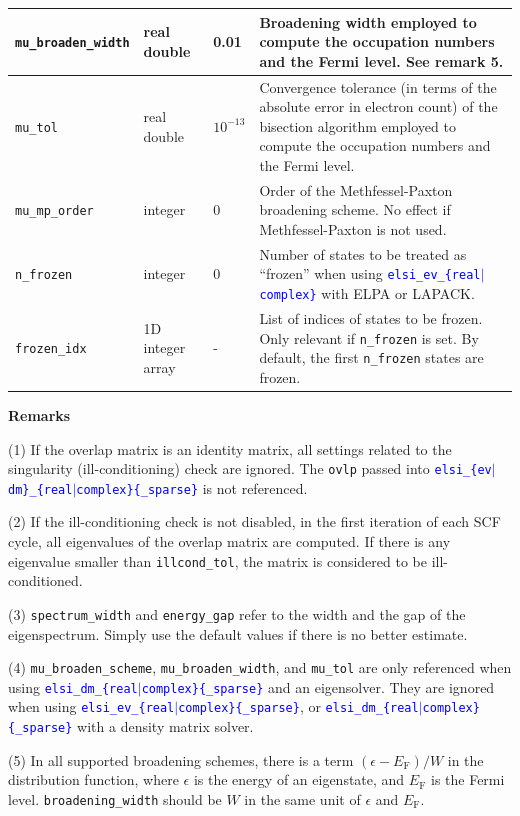 \documentclass{report}
\newcommand{\api}[1]{\textcolor{blue}{\texttt{#1}}}
\begin{document}
\begin{longtable}[]{|p{30mm}|p{20mm}|p{15mm}|p{97mm}|}
\hline
\texttt{mu\_broaden\_width}  & real double      & 0.01        & Broadening width employed to compute the occupation numbers and the Fermi level. See remark 5.\\
\hline
\texttt{mu\_tol}             & real double      & $10^{-13}$  & Convergence tolerance (in terms of the absolute error in electron count) of the bisection algorithm employed to compute the occupation numbers and the Fermi level.\\
\hline
\texttt{mu\_mp\_order}       & integer          & 0           & Order of the Methfessel-Paxton broadening scheme. No effect if Methfessel-Paxton is not used.\\
\hline
\texttt{n\_frozen}           & integer          & 0           & Number of states to be treated as ``frozen'' when using \api{elsi\_ev\_\{real$\vert$complex\}} with ELPA or LAPACK.\\
\hline
\texttt{frozen\_idx}         & 1D integer array & -           & List of indices of states to be frozen. Only relevant if \texttt{n\_frozen} is set. By default, the first \texttt{n\_frozen} states are frozen.\\
\hline
\end{longtable}

\textbf{Remarks}

(1) If the overlap matrix is an identity matrix, all settings related to the singularity (ill-conditioning) check are ignored. The \texttt{ovlp} passed into \api{elsi\_\{ev$\vert$dm\}\_\{real$\vert$complex\}\{\_sparse\}} is not referenced.

(2) If the ill-conditioning check is not disabled, in the first iteration of each SCF cycle, all eigenvalues of the overlap matrix are computed. If there is any eigenvalue smaller than \texttt{illcond\_tol}, the matrix is considered to be ill-conditioned.

(3) \texttt{spectrum\_width} and \texttt{energy\_gap} refer to the width and the gap of the eigenspectrum. Simply use the default values if there is no better estimate.

(4) \texttt{mu\_broaden\_scheme}, \texttt{mu\_broaden\_width}, and  \texttt{mu\_tol} are only referenced when using \api{elsi\_dm\_\{real$\vert$complex\}\{\_sparse\}} and an eigensolver. They are ignored when using \api{elsi\_ev\_\{real$\vert$complex\}\{\_sparse\}}, or \api{elsi\_dm\_\{real$\vert$complex\}\{\_sparse\}} with a density matrix solver.

(5) In all supported broadening schemes, there is a term $(\epsilon - E_\text{F})/W$ in the distribution function, where $\epsilon$ is the energy of an eigenstate, and $E_\text{F}$ is the Fermi level. \texttt{broadening\_width} should be $W$ in the same unit of $\epsilon$ and $E_\text{F}$.
\end{document}
